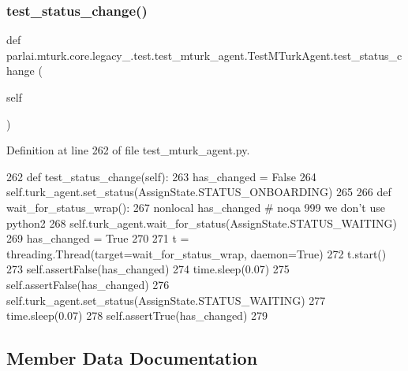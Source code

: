\subsubsection{\texorpdfstring{test\+\_\+status\+\_\+change()}{test\_status\_change()}}
{\footnotesize\ttfamily def parlai.\+mturk.\+core.\+legacy\+\_.\+test.\+test\+\_\+mturk\+\_\+agent.\+Test\+M\+Turk\+Agent.\+test\+\_\+status\+\_\+change (\begin{DoxyParamCaption}\item[{}]{self }\end{DoxyParamCaption})}



Definition at line 262 of file test\+\_\+mturk\+\_\+agent.\+py.


\begin{DoxyCode}
262     \textcolor{keyword}{def }test\_status\_change(self):
263         has\_changed = \textcolor{keyword}{False}
264         self.turk\_agent.set\_status(AssignState.STATUS\_ONBOARDING)
265 
266         \textcolor{keyword}{def }wait\_for\_status\_wrap():
267             nonlocal has\_changed  \textcolor{comment}{# noqa 999 we don't use python2}
268             self.turk\_agent.wait\_for\_status(AssignState.STATUS\_WAITING)
269             has\_changed = \textcolor{keyword}{True}
270 
271         t = threading.Thread(target=wait\_for\_status\_wrap, daemon=\textcolor{keyword}{True})
272         t.start()
273         self.assertFalse(has\_changed)
274         time.sleep(0.07)
275         self.assertFalse(has\_changed)
276         self.turk\_agent.set\_status(AssignState.STATUS\_WAITING)
277         time.sleep(0.07)
278         self.assertTrue(has\_changed)
279 
\end{DoxyCode}


\subsection{Member Data Documentation}
\mbox{\label{classparlai_1_1mturk_1_1core_1_1legacy__2018_1_1test_1_1test__mturk__agent_1_1TestMTurkAgent_a41e7f3413127521839d97699f2f6c5e6}} 
